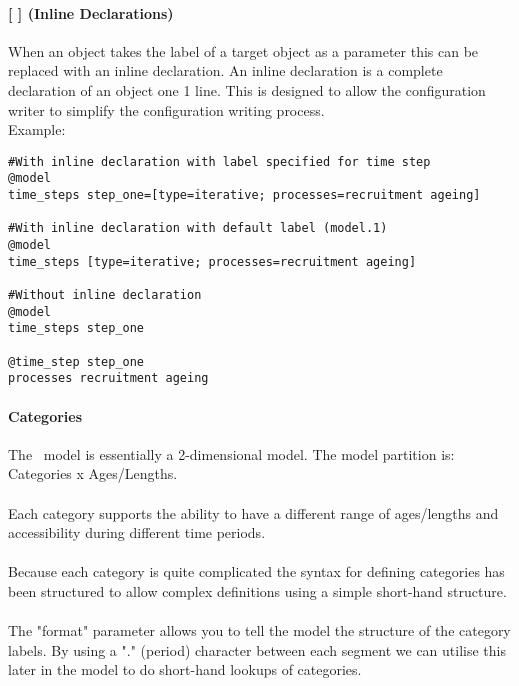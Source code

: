 \paragraph*{[ ] (Inline Declarations)}
When an object takes the label of a target object as a parameter this can be replaced with an inline declaration. An inline declaration is a complete declaration of an object one 1 line. This is designed to allow the configuration writer to simplify the configuration writing process.\\
Example:
{\small{\begin{verbatim}
#With inline declaration with label specified for time step
@model
time_steps step_one=[type=iterative; processes=recruitment ageing]

#With inline declaration with default label (model.1)
@model
time_steps [type=iterative; processes=recruitment ageing]

#Without inline declaration
@model
time_steps step_one

@time_step step_one
processes recruitment ageing
\end{verbatim}}}

\paragraph*{Categories}
The \CNAME\ model is essentially a 2-dimensional model. The model partition is:\\
Categories x Ages/Lengths.
\\\\
Each category supports the ability to have a different range of ages/lengths and accessibility during different time periods.
\\\\
Because each category is quite complicated the syntax for defining categories has been structured to allow complex definitions using a simple short-hand structure.
\\\\
The "format" parameter allows you to tell the model the structure of the category labels. By using a "." (period) character between each segment we can utilise this later in the model to do short-hand lookups of categories.

